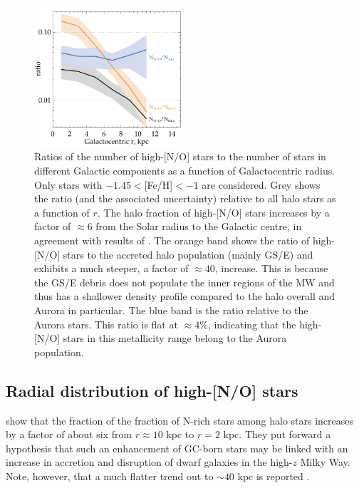 \documentclass[a4paper,useAMS,usenatbib]{mnras}
\begin{document}
%
\begin{figure}
  \centering
  \includegraphics[width=0.49\textwidth]{img/rad_profile_ratio.pdf}
  \caption[]{Ratios of the number of high-[N/O] stars to the number of stars in different Galactic components as a function of Galactocentric radius. Only stars with $-1.45<$[Fe/H]$<-1$ are considered. Grey shows the ratio (and the associated uncertainty) relative to all halo stars as a function of $r$. The halo fraction of high-[N/O] stars increases by a factor of $\approx6$ from the Solar radius to the Galactic centre, in agreement with results of \citet{Horta2021}. The orange band shows the ratio of high-[N/O] stars to the accreted halo population (mainly GS/E) and exhibits a much steeper, a factor of $\approx 40$, increase. This is because the GS/E debris does not populate the inner regions of the MW and thus has a shallower density profile compared to the halo overall and Aurora in particular. The blue band is the ratio relative to the Aurora stars. This ratio is flat at $\approx4\%$, indicating that the high-[N/O] stars in this metallicity range belong to the Aurora population.}
   \label{fig:ratio_rad}
\end{figure}
%

\subsection{Radial distribution of high-[N/O] stars}

\citet{Horta2021} show that the fraction of the fraction of N-rich stars among halo stars increases by a factor of about six  from $r\approx 10$ kpc to $r=2$ kpc. They put forward a hypothesis that such an enhancement of GC-born stars may be linked with an increase in accretion and disruption of dwarf galaxies in the high-$z$ Milky Way. Note, however, that a much flatter trend out to $\sim40$ kpc is reported \citep[see][]{Koch2019,Horta2021}.
\end{document}
